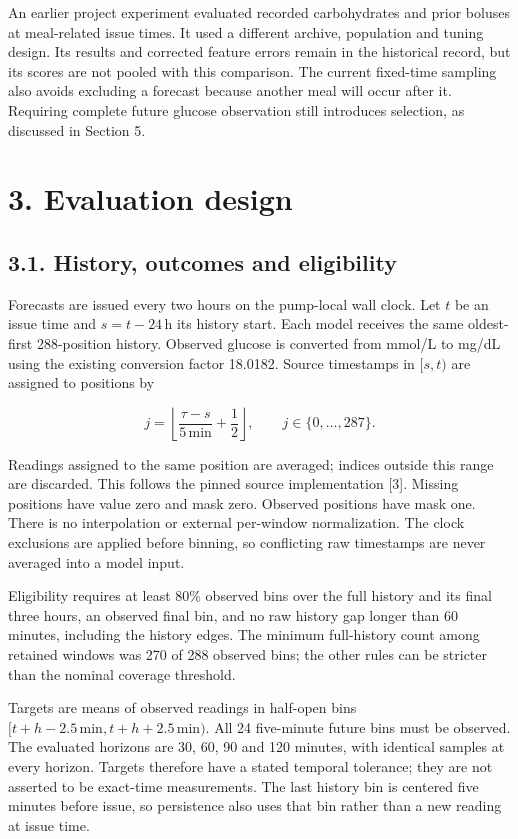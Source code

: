 \documentclass[11pt,letterpaper]{article}
\begin{document}
An earlier project experiment evaluated recorded carbohydrates and prior
boluses at meal-related issue times. It used a different archive,
population and tuning design. Its results and corrected feature errors
remain in the historical record, but its scores are not pooled with this
comparison. The current fixed-time sampling also avoids excluding a
forecast because another meal will occur after it. Requiring complete
future glucose observation still introduces selection, as discussed in
Section 5.

\section{3. Evaluation design}\label{evaluation-design}

\subsection{3.1. History, outcomes and
eligibility}\label{history-outcomes-and-eligibility}

Forecasts are issued every two hours on the pump-local wall clock. Let
\(t\) be an issue time and \(s=t-24\,\mathrm{h}\) its history start.
Each model receives the same oldest-first 288-position history. Observed
glucose is converted from mmol/L to mg/dL using the existing conversion
factor 18.0182. Source timestamps in \([s,t)\) are assigned to positions
by

\[
j=\left\lfloor\frac{\tau-s}{5\,\mathrm{min}}+\frac{1}{2}\right\rfloor,
\qquad j\in\{0,\ldots,287\}.
\]

Readings assigned to the same position are averaged; indices outside
this range are discarded. This follows the pinned source implementation
{[}3{]}. Missing positions have value zero and mask zero. Observed
positions have mask one. There is no interpolation or external
per-window normalization. The clock exclusions are applied before
binning, so conflicting raw timestamps are never averaged into a model
input.

Eligibility requires at least 80\% observed bins over the full history
and its final three hours, an observed final bin, and no raw history gap
longer than 60 minutes, including the history edges. The minimum
full-history count among retained windows was 270 of 288 observed bins;
the other rules can be stricter than the nominal coverage threshold.

Targets are means of observed readings in half-open bins
\([t+h-2.5\,\mathrm{min},t+h+2.5\,\mathrm{min})\). All 24 five-minute
future bins must be observed. The evaluated horizons are 30, 60, 90 and
120 minutes, with identical samples at every horizon. Targets therefore
have a stated temporal tolerance; they are not asserted to be exact-time
measurements. The last history bin is centered five minutes before
issue, so persistence also uses that bin rather than a new reading at
issue time.
\end{document}
